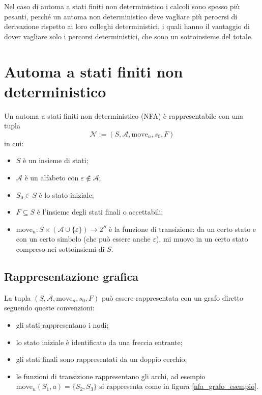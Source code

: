 \documentclass[class=book, crop=false, oneside, 12pt]{standalone}
\begin{document}
Nel caso di automa a stati finiti non deterministico i calcoli sono spesso più pesanti, perché un automa non deterministico deve vagliare più perocrsi di derivazione rispetto ai loro colleghi deterministici, i quali hanno il vantaggio di dover vagliare solo i percorsi deterministici, che sono un sottoinsieme del totale.

\section{Automa a stati finiti non deterministico}
Un automa a stati finiti non deterministico (NFA) è rappresentabile con una tupla
\begin{equation*}
    \mathcal{N} := (S, \mathcal{A}, \textrm{move}_n, s_0, F)
    \label{nfa_tupla}
\end{equation*}
in cui:
\begin{itemize}
    \item \(S\) è un insieme di stati;
    \item \(\mathcal{A}\) è un alfabeto con \(\varepsilon \notin \mathcal{A}\);
    \item \(S_0 \in S\) è lo stato iniziale;
    \item \(F \subseteq S\) è l’insieme degli stati finali o accettabili;
    \item \(\textrm{move}_n : S \times (\mathcal{A} \cup \{\varepsilon\}) \to 2^S\) è la funzione di transizione: da un certo stato e con un certo simbolo (che può essere anche \(\varepsilon\)), mi muovo in un certo stato compreso nei sottoinsiemi di \(S\).
\end{itemize}

\subsection{Rappresentazione grafica}
La tupla \((S, \mathcal{A}, \textrm{move}_n, s_0, F)\) può essere rappresentata con un grafo diretto seguendo queste convenzioni:
\begin{itemize}
    \item gli stati rappresentano i nodi;
    \item lo stato iniziale è identificato da una freccia entrante;
    \item gli stati finali sono rappresentati da un doppio cerchio;
    \item le funzioni di transizione rappresentano gli archi, ad esempio \(\textrm{move}_n(S_1, a) = \{S_2, S_3\}\) si rappresenta come in figura \ref{nfa_grafo_esempio}.
\end{itemize}
\end{document}
